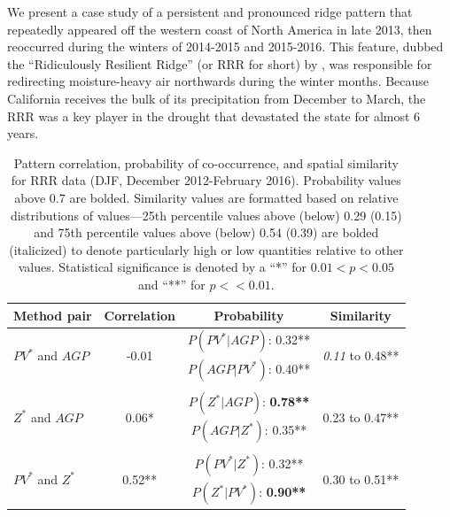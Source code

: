 \documentclass[smallextended]{svjour3}       %
\numberwithin{equation}{section}
\begin{document}

We present a case study of a persistent and pronounced ridge pattern that repeatedly appeared off the western coast of North America in late 2013, then reoccurred during the winters of 2014-2015 and 2015-2016. This feature, dubbed the ``Ridiculously Resilient Ridge'' (or RRR for short) by \cite{swain_extraordinary_2014}, was responsible for redirecting moisture-heavy air northwards during the winter months. Because California receives the bulk of its precipitation from December to March, the RRR was a key player in the drought that devastated the state for almost 6 years. 

\begin{table}
\caption{Pattern correlation, probability of co-occurrence, and spatial similarity for RRR data (DJF, December 2012-February 2016). {\color{blue} Probability values above 0.7 are bolded. Similarity values are formatted based on relative distributions of values---25th percentile values above (below) 0.29 (0.15) and 75th percentile values above (below) 0.54 (0.39) are bolded (italicized) to denote particularly high or low quantities relative to other values. Statistical significance is denoted by a ``*'' for $0.01<p<0.05$ and ``**'' for $p<<0.01$.} }\label{RRRtable}
\centering
\begin{tabular}{|l|ccc|}
\hline
Method pair & Correlation & Probability & Similarity \\
\hline
\multirow{2}{*}{$PV^*$ and $AGP$} & \multirow{2}{*}{-0.01} & $P(PV^*|AGP)$: 0.32** & \multirow{2}{*}{\textit{0.11} to 0.48**} \\
& & $P(AGP | PV^*)$: {0.40** }& \\
& & & \\
\multirow{2}{*}{$Z^*$ and $AGP$} & \multirow{2}{*}{0.06*} & $P(Z^*|AGP)$: \textbf{0.78**} & \multirow{2}{*}{0.23 to 0.47**} \\
& & $P(AGP | Z^*)$: {0.35**} & \\
& & & \\
\multirow{2}{*}{$PV^*$ and $Z^*$} & \multirow{2}{*}{0.52**} & $P(PV^*|Z^*)$: 0.32** & \multirow{2}{*}{0.30 to 0.51**} \\
& & $P(Z^* | PV^*)$: \textbf{0.90**} &  \\
\hline
\end{tabular}
\end{table}
\end{document}
